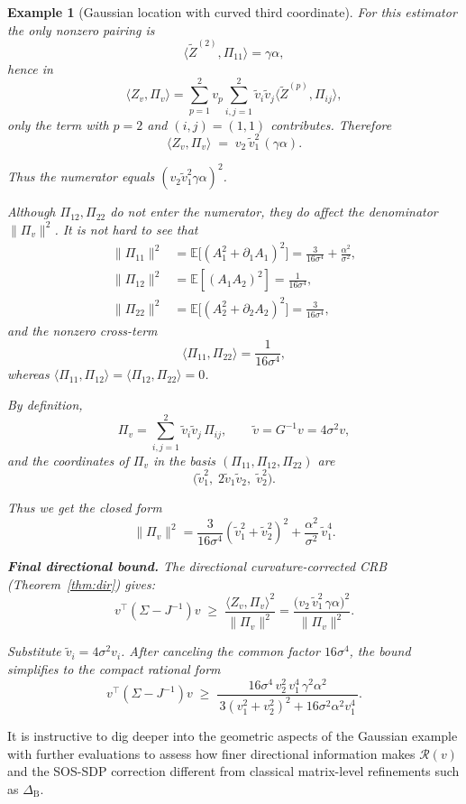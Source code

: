\documentclass[pdflatex,sn-mathphys-num]{sn-jnl}%
\newcommand{\E}{\mathbb{E}}
\theoremstyle{thmstyleone}%
\theoremstyle{thmstyletwo}%
\newtheorem{example}{Example}%
\theoremstyle{thmstylethree}%
\begin{document}
\begin{example}[Gaussian location with curved third coordinate]
For this estimator the only nonzero pairing is
\[
\langle\widetilde Z^{(2)},\Pi_{11}\rangle = \gamma\alpha,
\]
hence in 
\[
\langle Z_v,\Pi_v\rangle
= \sum_{p=1}^2 v_p \sum_{i,j=1}^2 \widetilde v_i\widetilde v_j \langle\widetilde Z^{(p)},\Pi_{ij}\rangle,
\]
only the term with \(p=2\) and \((i,j)=(1,1)\) contributes. Therefore
\[
\langle Z_v,\Pi_v\rangle \;=\; v_2\,\widetilde v_1^2\,(\gamma\alpha).
\]

Thus the numerator equals \((v_2\widetilde v_1^2\gamma\alpha)^2\).

Although \(\Pi_{12},\Pi_{22}\) do not enter the numerator, they \emph{do} affect the denominator \(\|\Pi_v\|^2\).
It is not hard to see that
\[
\begin{aligned}
\|\Pi_{11}\|^2 &= \E\big[(A_1^2+\partial_1 A_1)^2\big]
= \frac{3}{16\sigma^4} + \frac{\alpha^2}{\sigma^2},\\[6pt]
\|\Pi_{12}\|^2 &= \E[(A_1A_2)^2] = \frac{1}{16\sigma^4},\\[6pt]
\|\Pi_{22}\|^2 &= \E\big[(A_2^2+\partial_2 A_2)^2\big] = \frac{3}{16\sigma^4},
\end{aligned}
\]
and the nonzero cross-term
\[
\langle\Pi_{11},\Pi_{22}\rangle
= \frac{1}{16\sigma^4},
\]
whereas \(\langle\Pi_{11},\Pi_{12}\rangle=\langle\Pi_{12},\Pi_{22}\rangle=0\).  

By definition,
\[
\Pi_v = \sum_{i,j=1}^2 \widetilde v_i\widetilde v_j\,\Pi_{ij},
\qquad \widetilde v = G^{-1} v = 4\sigma^2 v,
\]
and the coordinates of \(\Pi_v\) in the basis \((\Pi_{11},\Pi_{12},\Pi_{22})\) are
\[
\big(\widetilde v_1^2,\; 2\widetilde v_1\widetilde v_2,\; \widetilde v_2^2\big).
\]

Thus we get the closed form
\[
\|\Pi_v\|^2
= \frac{3}{16\sigma^4}(\widetilde v_1^2+\widetilde v_2^2)^2
+ \frac{\alpha^2}{\sigma^2}\,\widetilde v_1^4.
\]

\noindent
\textbf{Final directional bound.}
The directional curvature-corrected CRB (Theorem~\ref{thm:dir}) gives:
\[
v^\top(\Sigma-J^{-1})v \;\ge\; 
\frac{\langle Z_v,\Pi_v\rangle^2}{\|\Pi_v\|^2}
= \frac{\big(v_2\,\widetilde v_1^2\,\gamma\alpha\big)^2}{\|\Pi_v\|^2}.
\]

Substitute \(\widetilde v_i=4\sigma^2 v_i\). After canceling the common factor \(16\sigma^4\), the bound simplifies to the compact rational form
\[
v^\top(\Sigma-J^{-1})v \;\ge\;
\frac{16\sigma^4\,v_2^2\,v_1^4\,\gamma^2\alpha^2}
{\,3(v_1^2+v_2^2)^2 + 16\sigma^2\alpha^2 v_1^4\, }.
\]
\end{example}

It is instructive to dig deeper into the geometric aspects of the Gaussian example with further evaluations to assess how finer directional information makes \(\mathcal{R}(v)\) and the SOS-SDP correction different from classical matrix-level refinements such as \(\Delta_{\mathrm{B}}\).
\end{document}
